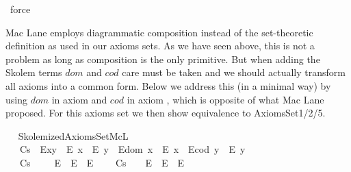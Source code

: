 \begin{isabellebody}
\ force%
\endisatagproof
{\isafoldproof}%
%
\isadelimproof
%
\endisadelimproof
\isanewline
\ \ \isamarkupfalse%
%
\isamarkuptrue%
%
\begin{isamarkuptext}%
Mac Lane employs diagrammatic composition instead of the set-theoretic 
     definition as used in our axioms sets. As we have seen above, 
      this is not a problem as long as composition is the only primitive. 
      But when adding the Skolem terms $dom$ and $cod$ care must be taken and we should
      actually transform all axioms into a common form. Below we address this (in a minimal way) by
      using $dom$ in axiom  and $cod$ in axiom , which is opposite of 
      what Mac Lane proposed. For this axioms set we then show  equivalence to AxiomsSet1/2/5.%
\end{isamarkuptext}\isamarkuptrue%
\ \isamarkupfalse%
\ SkolemizedAxiomsSetMcL\ {\isacharequal}\isanewline
\ \ \isanewline
\ \ \ Cs\ {\isacharcolon}\ {\isachardoublequoteopen}{\isacharparenleft}E{\isacharparenleft}x{\isasymcdot}y{\isacharparenright}\ \isactrlbold {\isasymrightarrow}\ {\isacharparenleft}E\ x\ \isactrlbold {\isasymand}\ E\ y{\isacharparenright}{\isacharparenright}\ {\isasymand}\ {\isacharparenleft}E{\isacharparenleft}dom\ x{\isacharparenright}\ \isactrlbold {\isasymrightarrow}\ E\ x{\isacharparenright}\ {\isasymand}\ {\isacharparenleft}E{\isacharparenleft}cod\ y{\isacharparenright}\ \isactrlbold {\isasymrightarrow}\ E\ y{\isacharparenright}{\isachardoublequoteclose}\ \ \ \ \isanewline
\ \ \ Cs\ {\isacharcolon}\ {\isachardoublequoteopen}\isactrlbold {\isasymforall}{\isasymgamma}\ {\isasymbeta}\ {\isasymalpha}{\isachardot}\ {\isacharparenleft}E{\isacharparenleft}{\isasymgamma}{\isasymcdot}{\isasymbeta}{\isacharparenright}\ \isactrlbold {\isasymand}\ E{\isacharparenleft}{\isacharparenleft}{\isasymgamma}{\isasymcdot}{\isasymbeta}{\isacharparenright}{\isasymcdot}{\isasymalpha}{\isacharparenright}{\isacharparenright}\ \isactrlbold {\isasymrightarrow}\ E{\isacharparenleft}{\isasymbeta}{\isasymcdot}{\isasymalpha}{\isacharparenright}{\isachardoublequoteclose}\ \isanewline
\ \ \ Cs{\isacharcolon}\ {\isachardoublequoteopen}\isactrlbold {\isasymforall}{\isasymgamma}\ {\isasymbeta}\ {\isasymalpha}{\isachardot}\ {\isacharparenleft}E{\isacharparenleft}{\isasymbeta}{\isasymcdot}{\isasymalpha}{\isacharparenright}\ \isactrlbold {\isasymand}\ E{\isacharparenleft}{\isasymgamma}{\isasymcdot}{\isacharparenleft}{\isasymbeta}{\isasymcdot}{\isasymalpha}{\isacharparenright}{\isacharparenright}{\isacharparenright}\ \isactrlbold {\isasymrightarrow}\ E{\isacharparenleft}{\isasymgamma}{\isasymcdot}{\isasymbeta}{\isacharparenright}{\isachardoublequoteclose}\ \isanewline

\end{isabellebody}
